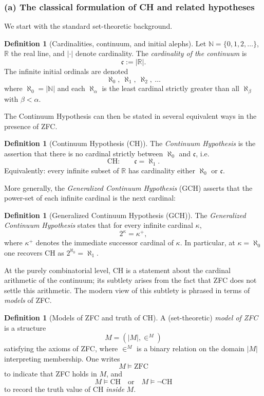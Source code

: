 \documentclass[11pt]{book}
\theoremstyle{plain}
\theoremstyle{definition}
\newtheorem{definition}[theorem]{Definition} \theoremstyle{remark}
\begin{document}
\subsubsection*{(a) The classical formulation of CH and related hypotheses}

We start with the standard set-theoretic background.

\begin{definition}[Cardinalities, continuum, and initial alephs]
  Let $\mathbb{N}=\{0,1,2,\dots\}$, $\mathbb{R}$ the real line, and
  $|\cdot|$ denote cardinality. The \emph{cardinality of the continuum}
  is
  \[
    \mathfrak{c} := |\mathbb{R}|.
  \]
  The infinite initial ordinals are denoted
  \[
    \aleph_0,\ \aleph_1,\ \aleph_2,\ \dots
  \]
  where $\aleph_0=|\mathbb{N}|$ and each $\aleph_\alpha$ is the least
  cardinal strictly greater than all $\aleph_\beta$ with $\beta<\alpha$.
\end{definition}

The Continuum Hypothesis can then be stated in several equivalent ways
in the presence of ZFC.

\begin{definition}[Continuum Hypothesis (CH)]
  The \emph{Continuum Hypothesis} is the assertion that there is no
  cardinal strictly between $\aleph_0$ and $\mathfrak{c}$, i.e.
  \[
    \text{CH:}\qquad
    \mathfrak{c} = \aleph_1.
  \]
  Equivalently: every infinite subset of $\mathbb{R}$ has cardinality
  either $\aleph_0$ or $\mathfrak{c}$.
\end{definition}

More generally, the \emph{Generalized Continuum Hypothesis} (GCH)
asserts that the power-set of each infinite cardinal is the next
cardinal:

\begin{definition}[Generalized Continuum Hypothesis (GCH)]
  The \emph{Generalized Continuum Hypothesis} states that for every
  infinite cardinal $\kappa$,
  \[
    2^\kappa = \kappa^+,
  \]
  where $\kappa^+$ denotes the immediate successor cardinal of $\kappa$.
  In particular, at $\kappa=\aleph_0$ one recovers CH as
  $2^{\aleph_0}=\aleph_1$.
\end{definition}

At the purely combinatorial level, CH is a statement about the
cardinal arithmetic of the continuum; its subtlety arises from the fact
that ZFC does not settle this arithmetic. The modern view of this
subtlety is phrased in terms of \emph{models} of ZFC.

\begin{definition}[Models of ZFC and truth of CH]
  A (set-theoretic) \emph{model of ZFC} is a structure
  \[
     M = (|M|,\in^M)
  \]
  satisfying the axioms of ZFC, where $\in^M$ is a binary relation on
  the domain $|M|$ interpreting membership. One writes
  \[
    M \models \text{ZFC}
  \]
  to indicate that ZFC holds in $M$, and
  \[
    M \models \text{CH}
    \quad\text{or}\quad
    M \models \neg\text{CH}
  \]
  to record the truth value of CH \emph{inside} $M$.
\end{definition}
\end{document}
